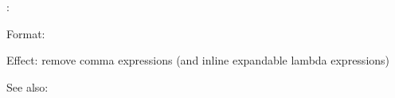 \uncomma:

Format: 

Effect: remove comma expressions (and inline expandable lambda expressions)

See also: \horizon
